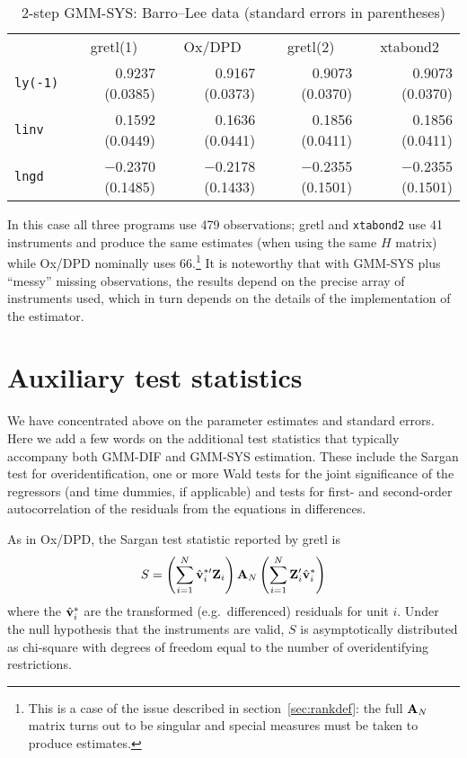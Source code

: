 \begin{table}[htbp]
\begin{center}
\begin{tabular}{lrrrr}
& \multicolumn{1}{c}{gretl(1)} & 
  \multicolumn{1}{c}{Ox/DPD} &
  \multicolumn{1}{c}{gretl(2)} & 
  \multicolumn{1}{c}{xtabond2} \\
\texttt{ly(-1)} & 0.9237 (0.0385) & 
  0.9167 (0.0373) & 
    0.9073 (0.0370) &
      0.9073 (0.0370) \\
\texttt{linv} & 0.1592 (0.0449) & 
  0.1636 (0.0441) & 
    0.1856 (0.0411) &
      0.1856 (0.0411) \\
\texttt{lngd} & $-$0.2370 (0.1485) & 
  $-$0.2178 (0.1433) & 
    $-$0.2355 (0.1501) &
      $-$0.2355 (0.1501) 
\end{tabular}
\caption{2-step GMM-SYS: Barro--Lee data (standard errors in parentheses)}
\label{tab:growth-SYS}
\end{center}
\end{table}

In this case all three programs use 479 observations; gretl and
\texttt{xtabond2} use 41 instruments and produce the same estimates
(when using the same $H$ matrix) while Ox/DPD nominally uses
66.\footnote{This is a case of the issue described in
  section~\ref{sec:rankdef}: the full $\mathbf{A}_N$ matrix turns out to be
  singular and special measures must be taken to produce estimates.}
It is noteworthy that with GMM-SYS plus ``messy'' missing
observations, the results depend on the precise array of instruments
used, which in turn depends on the details of the implementation of
the estimator.

\section{Auxiliary test statistics}
\label{sec:dpanel-aux}

We have concentrated above on the parameter estimates and standard
errors. Here we add a few words on the additional test statistics that
typically accompany both GMM-DIF and GMM-SYS estimation. These include
the Sargan test for overidentification, one or more Wald tests for the
joint significance of the regressors (and time dummies, if applicable)
and tests for first- and second-order autocorrelation of the residuals
from the equations in differences.

As in Ox/DPD, the Sargan test statistic reported by gretl is
\[
  S = \left(\sum_{i=1}^N \hat{\mathbf{v}}^{*\prime}_i \mathbf{Z}_i\right)  
   \mathbf{A}_N \left(\sum_{i=1}^N \mathbf{Z}_i' \hat{\mathbf{v}}^*_i\right)
\]
where the $\hat{\mathbf{v}}^*_i$ are the transformed (e.g.\ differenced)
residuals for unit $i$.  Under the null hypothesis that the
instruments are valid, $S$ is asymptotically distributed as chi-square
with degrees of freedom equal to the number of overidentifying
restrictions.

